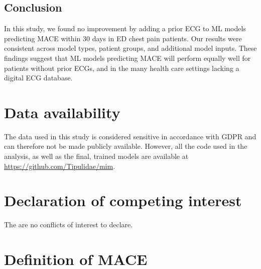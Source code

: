 \documentclass[preprint]{elsarticle}
\begin{document}
\subsection{Conclusion}
In this study, we found no improvement by adding a prior ECG to ML models predicting MACE within 30 days in ED chest pain patients. Our results were consistent across model types, patient groups, and additional model inputs. These findings suggest that ML models predicting MACE will perform equally well for patients without prior ECGs, and in the many health care settings lacking a digital ECG database.

\section*{Data availability}
The data used in this study is considered sensitive in accordance with GDPR and can therefore not be made publicly available. However, all the code used in the analysis, as well as the final, trained models are available at \url{https://github.com/Tipulidae/mim}. 

\section*{Declaration of competing interest}
The are no conflicts of interest to declare.



\appendix
\section{Definition of MACE}
\label{sec:appendix:mace}
\end{document}
